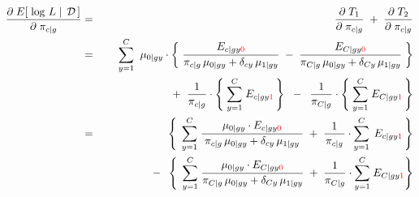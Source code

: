 \begin{eqnarray*}
\dfrac{\partial\;E\!\left[\,\left.\log\,L\;\right\vert\;\mathcal{D}\,\right]}{\partial\;\pi_{c \vert g}}
&=& \dfrac{\partial\;T_{1}}{\partial\;\pi_{c \vert g}} \;+\; \dfrac{\partial\;T_{2}}{\partial\;\pi_{c \vert g}}
\\
&=&
	{\color{white}+} \;\;
	\overset{C}{\underset{y=1}{\sum}}\;\;
	\mu_{0 \vert gy}
	\cdot
	\left\{\;
		\dfrac{E_{c \vert gy{\color{red}0}}}{\pi_{c \vert g}\,\mu_{0 \vert gy} + \delta_{cy}\,\mu_{1\vert gy}}
		\;-\;
		\dfrac{E_{C \vert gy{\color{red}0}}}{
			\pi_{C \vert g}\,\mu_{0 \vert gy}+\delta_{Cy}\,\mu_{1\vert gy}
			}
	\;\right\}
\\
&&
	+ \;\;
	\dfrac{1}{\pi_{c \vert g}}
	\cdot
	\left\{\;
		\overset{C}{\underset{y=1}{\sum}}\;
		E_{c \vert gy{\color{red}1}}
	\,\right\}
	\;\; - \;\;
	\dfrac{1}{\pi_{C \vert g}}
	\cdot
	\left\{\;
		\overset{C}{\underset{y=1}{\sum}}\;
		E_{C \vert gy{\color{red}1}}
	\,\right\}
\\
&=&
	{\color{white}-} \;\;
	\left\{\;\,
		\overset{C}{\underset{y=1}{\sum}}\;
		\dfrac{\mu_{0 \vert gy} \cdot E_{c \vert gy{\color{red}0}}}{
			{\color{white}.}
			\pi_{c \vert g}\,\mu_{0 \vert gy} + \delta_{cy}\,\mu_{1\vert gy}
			{\color{white}.}
			}
		\; + \;
		\dfrac{1}{
			{\color{white}\vert}\!
			\pi_{c \vert g}
			\!{\color{white}\vert}
			}
		\cdot
			\overset{C}{\underset{y=1}{\sum}}\;
			\,E_{c \vert gy{\color{red}1}}\,
	\right\}
\\
&&
	- \;\;
	\left\{\;\,
		\overset{C}{\underset{y=1}{\sum}}\;
		\dfrac{\mu_{0 \vert gy} \cdot E_{C \vert gy{\color{red}0}}}
			{\pi_{C \vert g}\,\mu_{0 \vert gy} + \delta_{Cy}\,\mu_{1\vert gy}}
		\; + \;
		\dfrac{1}{\pi_{C \vert g}}
		\cdot
			\overset{C}{\underset{y=1}{\sum}}\;
			E_{C \vert gy{\color{red}1}}
	\right\}
\end{eqnarray*}

